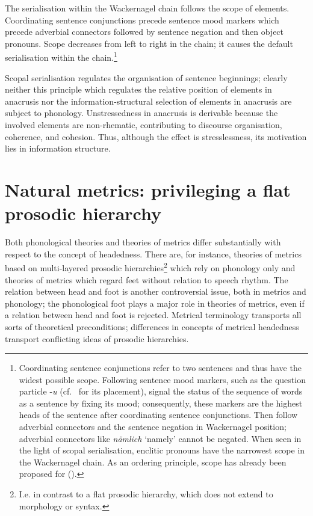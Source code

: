 \documentclass[output=paper
  ,nobabel
  ,uniformtopskip %
]{langscibook}
\begin{document}

The serialisation within the Wackernagel chain follows the scope of elements. Coordinating sentence conjunctions precede sentence mood markers which precede adverbial connectors followed by sentence negation and then object pronouns. Scope decreases from left to right in the chain; it causes the default serialisation within the chain.\footnote{Coordinating sentence conjunctions refer to two sentences and thus have the widest possible scope. Following sentence mood markers, such as the  question particle -\textit{u} (cf.\ \citealp{NoelAzizHanna2013a} for its placement), signal the status of the sequence of words as a sentence by fixing its mood; consequently, these markers are the highest heads of the sentence after coordinating sentence conjunctions. Then follow adverbial connectors and the sentence negation in Wackernagel position; adverbial connectors like  \textit{nämlich} `namely' cannot be negated. When seen in the light of scopal serialisation, enclitic pronouns have the narrowest scope in the Wackernagel chain. As an ordering principle, scope has already been proposed for  (\cite{Luraghi1990}).}  

Scopal serialisation regulates the organisation of sentence beginnings; clearly neither this principle which regulates the relative position of elements in anacrusis nor the information-structural selection of elements in anacrusis are subject to phonology. Unstressedness in anacrusis is derivable because the involved elements are non-rhematic, contributing to discourse organisation, coherence, and cohesion. Thus, although the effect is stresslessness, its motivation lies in information structure.

\section{Natural metrics: privileging a flat prosodic hierarchy}\label{sec-natmetrics} 

Both phonological theories and theories of metrics differ substantially with respect to the concept of headedness. There are, for instance, theories of metrics based on multi-layered prosodic hierarchies\footnote{I.e. in contrast to a flat prosodic hierarchy, which does not extend to morphology or syntax.} which rely on phonology only and theories of metrics which regard feet without relation to speech rhythm. The relation between head and foot is another controversial issue, both in metrics and phonology; the phonological foot plays a major role in theories of metrics, even if a relation between head and foot is rejected. Metrical terminology transports all sorts of theoretical preconditions; differences in concepts of metrical headedness transport conflicting ideas of prosodic hierarchies. 
\end{document}
